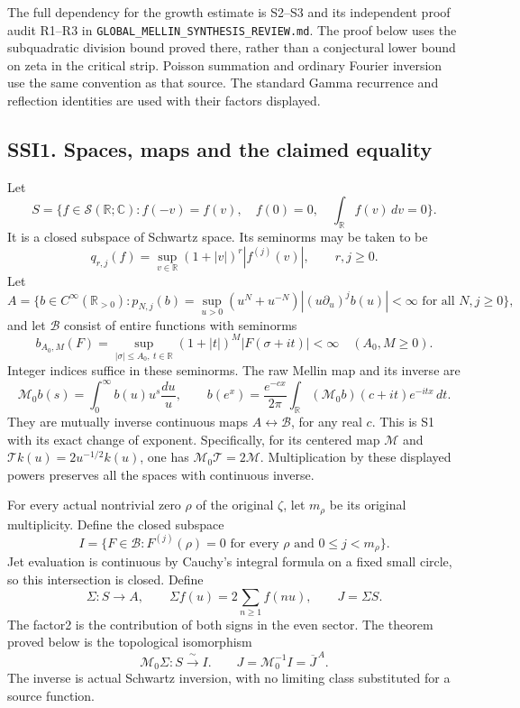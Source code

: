 The full dependency for the growth estimate is S2--S3 and its
independent proof audit R1--R3 in
\nolinkurl{GLOBAL_MELLIN_SYNTHESIS_REVIEW.md}. The proof below uses the
subquadratic division bound proved there, rather than a conjectural
lower bound on zeta in the critical strip. Poisson summation and
ordinary Fourier inversion use the same convention as that source. The
standard Gamma recurrence and reflection identities are used with their
factors displayed.

\subsection{SSI1. Spaces, maps and the claimed
equality}\label{ssi1.-spaces-maps-and-the-claimed-equality}

Let \[
S=\{f\in\mathcal S(\mathbb R;\mathbb C):
 f(-v)=f(v),\quad f(0)=0,\quad\int_{\mathbb R}f(v)\,dv=0\}.
\tag{SSI1.1}
\] It is a closed subspace of Schwartz space. Its seminorms may be taken
to be \[
q_{r,j}(f)=\sup_{v\in\mathbb R}(1+|v|)^r|f^{(j)}(v)|,
\qquad r,j\ge0.
\tag{SSI1.2}
\] Let \[
A=\{b\in C^\infty(\mathbb R_{>0}):
 p_{N,j}(b)=\sup_{u>0}(u^N+u^{-N})|(u\partial_u)^jb(u)|<\infty
 \text{ for all }N,j\ge0\},
\tag{SSI1.3}
\] and let \(\mathcal B\) consist of entire functions with seminorms \[
b_{A_0,M}(F)=\sup_{|\sigma|\le A_0,\ t\in\mathbb R}
 (1+|t|)^M|F(\sigma+it)|<\infty
\quad(A_0,M\ge0).
\tag{SSI1.4}
\] Integer indices suffice in these seminorms. The raw Mellin map and
its inverse are \[
\mathcal M_0b(s)=\int_0^\infty b(u)u^s\frac{du}{u},\qquad
b(e^x)=\frac{e^{-cx}}{2\pi}\int_{\mathbb R}
 (\mathcal M_0b)(c+it)e^{-itx}\,dt .
\tag{SSI1.5}
\] They are mutually inverse continuous maps
\(A\leftrightarrow\mathcal B\), for any real \(c\). This is S1 with its
exact change of exponent. Specifically, for its centered map
\(\mathcal M\) and \(\mathcal T k(u)=2u^{-1/2}k(u)\), one has
\(\mathcal M_0\mathcal T=2\mathcal M\). Multiplication by these
displayed powers preserves all the spaces with continuous inverse.

For every actual nontrivial zero \(\rho\) of the original \(\zeta\), let
\(m_\rho\) be its original multiplicity. Define the closed subspace \[
I=\{F\in\mathcal B:F^{(j)}(\rho)=0
 \text{ for every }\rho\text{ and }0\le j<m_\rho\}.
\tag{SSI1.6}
\] Jet evaluation is continuous by Cauchy's integral formula on a fixed
small circle, so this intersection is closed. Define \[
\Sigma:S\longrightarrow A,\qquad
\Sigma f(u)=2\sum_{n\ge1}f(nu),\qquad J=\Sigma S.
\tag{SSI1.7}
\] The factor2 is the contribution of both signs in the even sector. The
theorem proved below is the topological isomorphism \[
\boxed{\mathcal M_0\Sigma:S\xrightarrow{\ \sim\ }I.}
\qquad
\boxed{J=\mathcal M_0^{-1}I=\overline J^{\,A}.}
\tag{SSI1.8}
\] The inverse is actual Schwartz inversion, with no limiting class
substituted for a source function.

